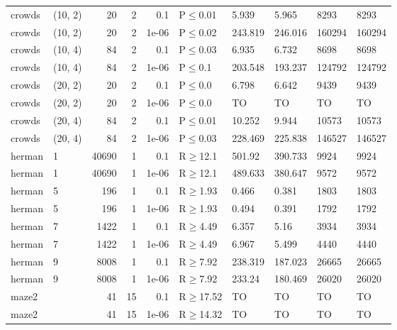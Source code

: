 \begin{longtable}{llrrrlllll}
 crowds        & (10, 2)   &     	20 &   2 & 0.1   & P$\leq$0.01  & 5.939    & 5.965    & 8293    & 8293    \\
 crowds        & (10, 2)   &     	20 &   2 & 1e-06 & P$\leq$0.02  & 243.819  & 246.016  & 160294  & 160294  \\
 crowds        & (10, 4)   &     	84 &   2 & 0.1   & P$\leq$0.03  & 6.935    & 6.732    & 8698    & 8698    \\
 crowds        & (10, 4)   &     	84 &   2 & 1e-06 & P$\leq$0.1   & 203.548  & 193.237  & 124792  & 124792  \\
 crowds        & (20, 2)   &     	20 &   2 & 0.1   & P$\leq$0.0   & 6.798    & 6.642    & 9439    & 9439    \\
 crowds        & (20, 2)   &     	20 &   2 & 1e-06 & P$\leq$0.0   & TO       & TO       & TO      & TO      \\
 crowds        & (20, 4)   &     	84 &   2 & 0.1   & P$\leq$0.01  & 10.252   & 9.944    & 10573   & 10573   \\
 crowds        & (20, 4)   &     	84 &   2 & 1e-06 & P$\leq$0.03  & 228.469  & 225.838  & 146527  & 146527  \\
 herman        & 1         &  	40690 &   1 & 0.1   & R$\geq$12.1  & 501.92   & 390.733  & 9924    & 9924    \\
 herman        & 1         &  	40690 &   1 & 1e-06 & R$\geq$12.1  & 489.633  & 380.647  & 9572    & 9572    \\
 herman        & 5         &    	196 &   1 & 0.1   & R$\geq$1.93  & 0.466    & 0.381    & 1803    & 1803    \\
 herman        & 5         &    	196 &   1 & 1e-06 & R$\geq$1.93  & 0.494    & 0.391    & 1792    & 1792    \\
 herman        & 7         &   	1422 &   1 & 0.1   & R$\geq$4.49  & 6.357    & 5.16     & 3934    & 3934    \\
 herman        & 7         &   	1422 &   1 & 1e-06 & R$\geq$4.49  & 6.967    & 5.499    & 4440    & 4440    \\
 herman        & 9         &   	8008 &   1 & 0.1   & R$\geq$7.92  & 238.319  & 187.023  & 26665   & 26665   \\
 herman        & 9         &   	8008 &   1 & 1e-06 & R$\geq$7.92  & 233.24   & 180.469  & 26020   & 26020   \\
 maze2         &           &     	41 &  15 & 0.1   & R$\geq$17.52 & TO       & TO       & TO      & TO      \\
 maze2         &           &     	41 &  15 & 1e-06 & R$\geq$14.32 & TO       & TO       & TO      & TO      \\

\end{longtable}
